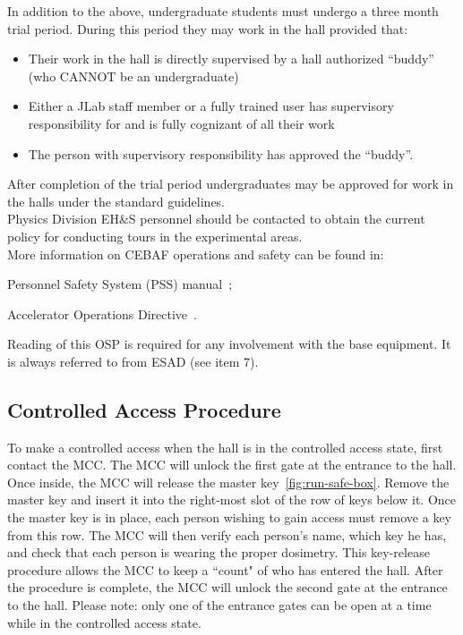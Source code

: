 In addition to the above, undergraduate students must undergo a three
 month trial period. During this period they may work in the hall
 provided that:

\begin{itemize}
\item Their work in the hall is directly supervised by a hall
 authorized ``buddy'' (who CANNOT be an undergraduate)
\item Either a JLab staff member or a fully trained user has
 supervisory responsibility for and is fully cognizant of all their
 work
\item The person with supervisory responsibility has approved the
``buddy''.
\end{itemize}

\noindent{}After completion of the trial period undergraduates may be
approved for work in the halls under the standard guidelines. \\ 

\noindent{}Physics Division EH\&S personnel should be contacted to obtain
the current policy for conducting tours in the experimental areas.\\ 

\noindent{} More information on CEBAF operations and safety can be found in:
 \begin{list}{--}{\setlength{\itemsep}{-0.2cm}}
    \item Personnel Safety System (PSS) manual~\cite{PSScebaf};
    \item Accelerator Operations Directive~\cite{AODcebaf}.
 \end{list}


 \noindent{}Reading of this OSP is required for any involvement
 with the base equipment. 
 It is always referred to from ESAD (see item 7).


\begin{safetyen}{10}{10}
\subsection{Controlled Access Procedure} 
\end{safetyen}

To make a controlled access when the hall is in the controlled access
state, first contact the MCC. The MCC will unlock the first gate at
the entrance to the hall. Once inside, the MCC will release the master
key~\ref{fig:run-safe-box}. 
Remove the master key and insert it into the right-most slot of
the row of keys below it. Once the master key is in place, each person
wishing to gain access must remove a key from this row. The MCC will
then verify each person's name, which key he has, and check that each
person is wearing the proper dosimetry. This key-release procedure
allows the MCC to keep a ``count" of who has entered the hall. After
the procedure is complete, the MCC will unlock the second gate at the
entrance to the hall. Please note: only one of the entrance gates can
be open at a time while in the controlled access state.
 
